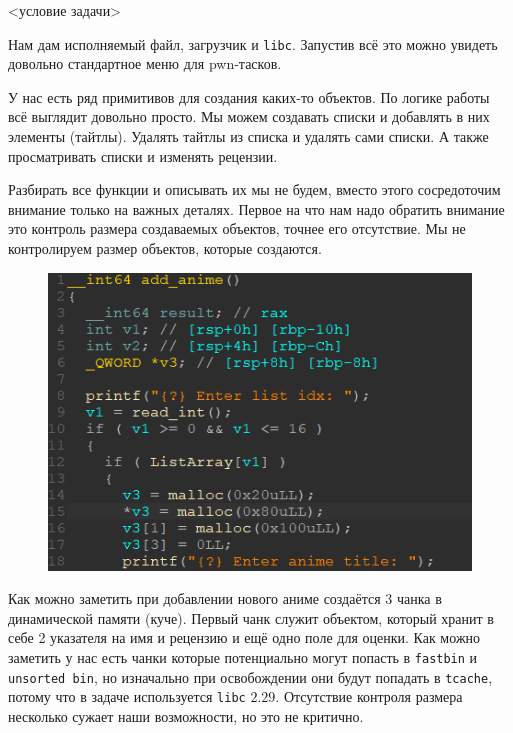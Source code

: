 \documentclass[idxtotoc,hyperref,openany,oneside]{files/pwn} %
\begin{document}
\begin{tcolorbox}
<условие задачи>
\end{tcolorbox}

Нам дам исполняемый файл, загрузчик и \verb|libc|. Запустив всё это можно увидеть довольно стандартное меню для pwn-тасков.

У нас есть ряд примитивов для создания каких-то объектов. По логике работы всё выглядит довольно просто. Мы можем создавать списки и добавлять в них элементы (тайтлы). Удалять тайтлы из списка и удалять сами списки. А также просматривать списки и изменять рецензии.

Разбирать все функции и описывать их мы не будем, вместо этого сосредоточим внимание только на важных деталях. Первое на что нам надо обратить внимание это контроль размера создаваемых объектов, точнее его отсутствие. Мы не контролируем размер объектов, которые создаются.
\begin{figure}[H]
\begin{center}
\includegraphics[width=1.0\linewidth]{files/mal-add-anime}
\end{center}
\label{fig:mal-add-anime}
\end{figure}

Как можно заметить при добавлении нового аниме создаётся 3 чанка в динамической памяти (куче). Первый чанк служит объектом, который хранит в себе 2 указателя на имя и рецензию и ещё одно поле для оценки. Как можно заметить у нас есть чанки которые потенциально могут попасть в \verb|fastbin| и \verb|unsorted bin|, но изначально при освобождении они будут попадать в \verb|tcache|, потому что в задаче используется \verb|libc| $2.29$. Отсутствие контроля размера несколько сужает наши возможности, но это не критично.
\end{document}
